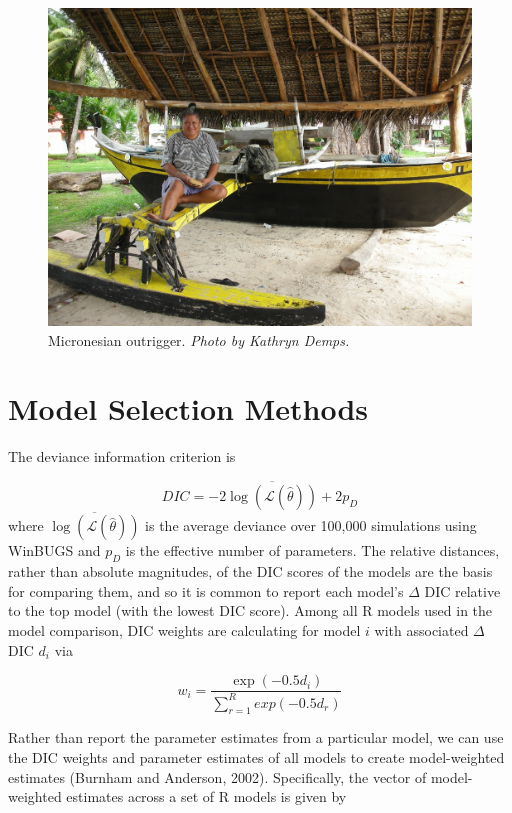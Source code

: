 \documentclass[11pt]{article}
\begin{document}
\begin{figure}[h]
\begin{center}
\includegraphics[scale=1]{figures/microOutrigger.jpg}
\caption{Micronesian outrigger. \textit{Photo by Kathryn Demps.}}
\end{center}
\end{figure}

\newpage
\section{Model Selection Methods}

The deviance information criterion is

 \[ DIC = -2 \overline{\log(\mathcal{L}(\widehat{\theta}))} + 2p_D
\]
where $\overline{\log(\mathcal{L}(\widehat{\theta}))}$ is the average deviance over 100,000 simulations using WinBUGS and $p_D$ is the effective number of parameters. The relative distances, rather than absolute magnitudes, of the DIC scores of the models are the basis for comparing them, and so it is common to report each model's $\Delta$ DIC relative to the top model (with the lowest DIC score). Among all R models used in the model comparison, DIC weights are calculating for model $i$ with associated $\Delta$ DIC $d_i$ via

\[w_i = \frac{\exp(-0.5 d_i)}{\sum_{r=1}^R exp(-0.5 d_r)}
\]

Rather than report the parameter estimates from a particular model, we can use the DIC weights and parameter estimates of all models to create model-weighted estimates (Burnham and Anderson, 2002). Specifically, the vector of model-weighted estimates across a set of R models is given by
\end{document}
